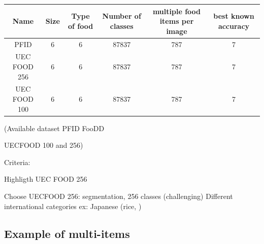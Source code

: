 \documentclass[aspectratio=169]{beamer}
\newenvironment{myframe}[1][t]{\begin{frame}[#1]{\secname}{\subsecname}}{\end{frame}}
\begin{document}
     \begin{myframe}
         \begin{center}
             \setlength{\tabcolsep}{5pt} %
             \renewcommand{\arraystretch}{1.5} %
             \begin{tabular}{||c | c c c c c||} 
                 \hline
                 Name & Size & Type of food & Number of classes & multiple food items per image & best known accuracy \\
                 \hline\hline
                 PFID & 6 & 6  & 87837 & 787 & 7 \\ 
                 \hline
                 UEC FOOD 256 & 6 & 6  & 87837 & 787 & 7 \\ 
                 \hline
                 UEC FOOD 100 & 6 & 6  & 87837 & 787 & 7 \\ 
                 \hline
             \end{tabular}
        \end{center}
         
         (Available dataset
         PFID
         FooDD
         
         UECFOOD 100 and 256)
         
         Criteria: 
         
         Highligth UEC FOOD 256
         
         Choose UECFOOD 256: segmentation, 256 classes (challenging)
         Different international categories ex: Japanese (rice, )
    \end{myframe}
    
    \subsection{Example of multi-items}
    
\end{document}
